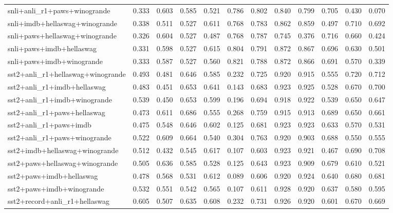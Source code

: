 \begin{table}[t]
\begin{tabular}{lrrrrrrrrrrr}
    snli+anli\_r1+paws+winogrande & 0.333 & 0.603 & 0.585 & 0.521 & 0.786 & 0.802 & 0.840 & 0.799 & 0.705 & 0.430 & 0.070 \\
    snli+imdb+hellaswag+winogrande & 0.338 & 0.511 & 0.527 & 0.611 & 0.768 & 0.783 & 0.862 & 0.859 & 0.497 & 0.710 & 0.692 \\
    snli+paws+hellaswag+winogrande & 0.326 & 0.604 & 0.527 & 0.487 & 0.768 & 0.787 & 0.745 & 0.376 & 0.716 & 0.660 & 0.424 \\
    snli+paws+imdb+hellaswag & 0.331 & 0.598 & 0.527 & 0.615 & 0.804 & 0.791 & 0.872 & 0.867 & 0.696 & 0.630 & 0.501 \\
    snli+paws+imdb+winogrande & 0.333 & 0.587 & 0.527 & 0.560 & 0.821 & 0.788 & 0.872 & 0.866 & 0.691 & 0.570 & 0.339 \\
    sst2+anli\_r1+hellaswag+winogrande & 0.493 & 0.481 & 0.646 & 0.585 & 0.232 & 0.725 & 0.920 & 0.915 & 0.555 & 0.720 & 0.712 \\
    sst2+anli\_r1+imdb+hellaswag & 0.483 & 0.451 & 0.653 & 0.641 & 0.143 & 0.683 & 0.923 & 0.925 & 0.528 & 0.670 & 0.700 \\
    sst2+anli\_r1+imdb+winogrande & 0.539 & 0.450 & 0.653 & 0.599 & 0.196 & 0.694 & 0.918 & 0.922 & 0.539 & 0.650 & 0.647 \\
    sst2+anli\_r1+paws+hellaswag & 0.473 & 0.611 & 0.686 & 0.555 & 0.268 & 0.759 & 0.915 & 0.913 & 0.689 & 0.650 & 0.661 \\
    sst2+anli\_r1+paws+imdb & 0.475 & 0.548 & 0.646 & 0.602 & 0.125 & 0.681 & 0.923 & 0.923 & 0.633 & 0.570 & 0.531 \\
    sst2+anli\_r1+paws+winogrande & 0.522 & 0.609 & 0.664 & 0.540 & 0.304 & 0.763 & 0.920 & 0.903 & 0.688 & 0.550 & 0.555 \\
    sst2+imdb+hellaswag+winogrande & 0.512 & 0.432 & 0.545 & 0.617 & 0.107 & 0.603 & 0.923 & 0.921 & 0.467 & 0.690 & 0.708 \\
    sst2+paws+hellaswag+winogrande & 0.505 & 0.636 & 0.585 & 0.528 & 0.125 & 0.643 & 0.923 & 0.909 & 0.679 & 0.610 & 0.521 \\
    sst2+paws+imdb+hellaswag & 0.478 & 0.568 & 0.531 & 0.612 & 0.089 & 0.606 & 0.920 & 0.924 & 0.640 & 0.680 & 0.681 \\
    sst2+paws+imdb+winogrande & 0.532 & 0.551 & 0.542 & 0.565 & 0.107 & 0.611 & 0.928 & 0.920 & 0.637 & 0.580 & 0.595 \\
    sst2+record+anli\_r1+hellaswag & 0.605 & 0.507 & 0.635 & 0.608 & 0.232 & 0.731 & 0.926 & 0.920 & 0.601 & 0.670 & 0.669 \\

\end{tabular}
\end{table}
